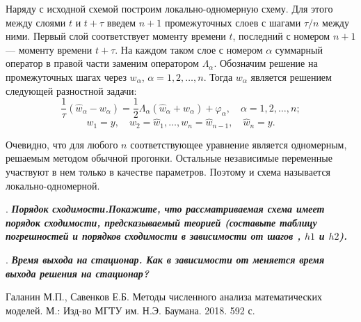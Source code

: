 \documentclass[12pt, a4paper]{article}
\newcounter{mycounter}
\newcommand{\quastion}[1]{%
	\stepcounter{mycounter}%
	\textbf{\themycounter}.  %
	\textbf{\textit{#1}}
	
}
\begin{document}
	Наряду с исходной схемой построим локально-одномерную схему. Для этого между слоями $t$ и $t + \tau$ введем $n+1$ промежуточных слоев с шагами $\tau/n$ между ними. Первый слой соответствует моменту времени $t$, последний с номером $n+1$ — моменту времени $t + \tau$. На каждом таком слое с номером $\alpha$ суммарный оператор в правой части заменим оператором $\Lambda_\alpha$. Обозначим решение на промежуточных шагах через $w_\alpha$, $\alpha = 1, 2, \ldots, n$. Тогда $w_\alpha$ является решением следующей разностной задачи:
	\begin{equation*}
		\frac{1}{\tau} (\hat{w}_\alpha - w_\alpha) = \frac{1}{2} \Lambda_\alpha (\hat{w}_\alpha + w_\alpha) + \varphi_\alpha, \quad \alpha = 1, 2, \ldots, n;
	\end{equation*}
	\begin{equation*}
		w_1 = y, \quad w_2 = \hat{w}_1, \ldots, w_n = \hat{w}_{n-1}, \quad \hat{w}_n = y.
	\end{equation*}
	
	Очевидно, что для любого $n$ соответствующее уравнение является одномерным, решаемым методом обычной прогонки. Остальные независимые переменные участвуют в нем только в качестве параметров. Поэтому и схема называется локально-одномерной.
	\bigskip
	
	
	
	\quastion{Порядок сходимости.Покажите, что рассматриваемая схема имеет порядок сходимости, предсказываемый теорией (составьте таблицу погрешностей и порядков сходимости в зависимости от шагов , $h1$ и $h2$).}
	\bigskip
	
	
	
	\quastion{ Время выхода на стационар. Как в зависимости от меняется время выхода решения на стационар?}
	\bigskip
	
	
	
	
	
	\clearpage
	\begin{thebibliography}{1}
		 Галанин М.П., Савенков Е.Б. Методы численного анализа математических моделей. М.: Изд-во МГТУ им. Н.Э. Баумана. 2018. 592 с.
		
	\end{thebibliography}
	
\end{document}
